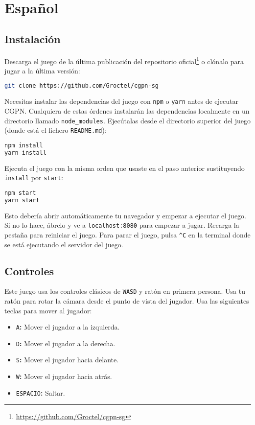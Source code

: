 \chapter*{Español}

\section*{Instalación}

Descarga el juego de la última publicación del repositorio oficial\footnote{%
	\url{https://github.com/Groctel/cgpn-sg}
}
o clónalo para jugar a la última versión:

\begin{lstlisting}[language=sh]
git clone https://github.com/Groctel/cgpn-sg
\end{lstlisting}

Necesitas instalar las dependencias del juego con \texttt{npm} o \texttt{yarn} antes de ejecutar CGPN\@.
Cualquiera de estas órdenes instalarán las dependencias localmente en un directorio llamado \texttt{node\_modules}.
Ejecútalas desde el directorio superior del juego (donde está el fichero \texttt{README.md}):

\begin{lstlisting}[language=sh]
npm install
yarn install
\end{lstlisting}

Ejecuta el juego con la misma orden que usaste en el paso anterior sustituyendo \texttt{install} por \texttt{start}:

\begin{lstlisting}[language=sh]
npm start
yarn start
\end{lstlisting}

Esto debería abrir automáticamente tu navegador y empezar a ejecutar el juego.
Si no lo hace, ábrelo y ve a \texttt{localhost:8080} para empezar a jugar.
Recarga la pestaña para reiniciar el juego.
Para parar el juego, pulsa \texttt{\^{}C} en la terminal donde se está ejecutando el servidor del juego.

\section*{Controles}

Este juego usa los controles clásicos de \texttt{WASD} y ratón en primera persona.
Usa tu ratón para rotar la cámara desde el punto de vista del jugador.
Usa las siguientes teclas para mover al jugador:

\begin{itemize}
	\item
		\texttt{A}\textbf{:}
		Mover el jugador a la izquierda.
	\item
		\texttt{D}\textbf{:}
		Mover el jugador a la derecha.
	\item
		\texttt{S}\textbf{:}
		Mover el jugador hacia delante.
	\item
		\texttt{W}\textbf{:}
		Mover el jugador hacia atrás.
	\item
		\texttt{ESPACIO}\textbf{:}
		Saltar.
\end{itemize}

